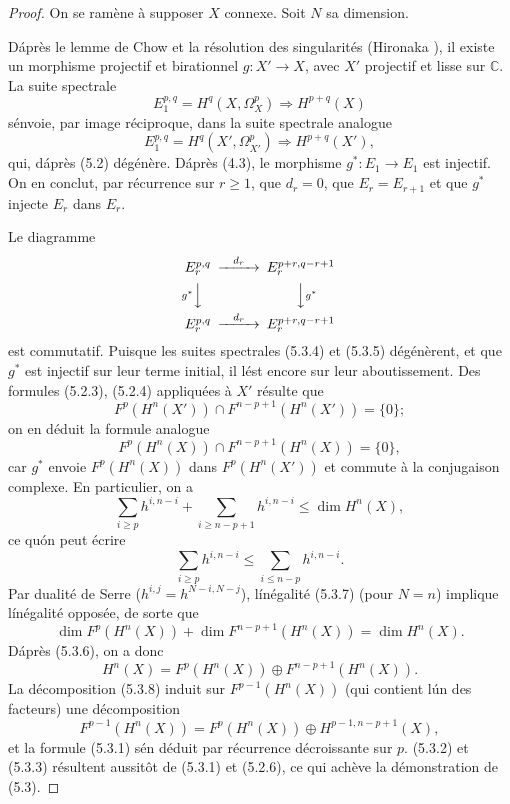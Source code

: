 \documentclass[12pt]{amsart}
\theoremstyle{plain}
\theoremstyle{remark}
\begin{document}
\begin{proof}
On se ram\`ene \`a supposer $X$ connexe. Soit $N$ sa dimension.

D\'apr\`es le lemme de Chow et la r\'esolution des singularit\'es (Hironaka \cite{Hironaka}), il existe un morphisme projectif et birationnel $g : X' \to X$, avec $X'$ projectif et lisse sur $\mathbb{C}$. La suite spectrale
\begin{equation}\label{eq:5.3.4}
E_1^{p,q} = H^q(X, \Omega_{X}^p) \Rightarrow H^{p+q}(X)
\end{equation}
s\'envoie, par image r\'eciproque, dans la suite spectrale analogue
\begin{equation}\label{eq:5.3.5}
E_1^{p,q} = H^q(X', \Omega_{X'}^p) \Rightarrow H^{p+q}(X'),
\end{equation}
qui, d\'apr\`es (5.2) d\'eg\'en\`ere. D\'apr\`es (4.3), le morphisme $g^* : E_1 \to E_1$ est injectif. On en conclut, par r\'ecurrence sur $r \geq 1$, que $d_r = 0$, que $E_r = E_{r+1}$ et que $g^*$ injecte $E_r$ dans $E_r$.

Le diagramme
\[
\begin{CD}
E_r^{p,q} @>{d_r}>> E_r^{p+r,q-r+1} \\
@V{g^*}VV @VV{g^*}V \\
E_r^{p,q} @>{d_r}>> E_r^{p+r,q-r+1}
\end{CD}
\]
est commutatif. Puisque les suites spectrales (5.3.4) et (5.3.5) d\'eg\'en\`erent, et que $g^*$ est injectif sur leur terme initial, il l\'est encore sur leur aboutissement. Des formules (5.2.3), (5.2.4) appliqu\'ees \`a $X'$ r\'esulte que
\[
F^p(H^n(X')) \cap F^{n-p+1}(H^n(X')) = \{0\};
\]
on en d\'eduit la formule analogue
\begin{equation}\label{eq:5.3.6}
F^p(H^n(X)) \cap F^{n-p+1}(H^n(X)) = \{0\},
\end{equation}
car $g^*$ envoie $F^p(H^n(X))$ dans $F^p(H^n(X'))$ et commute \`a la conjugaison complexe. En particulier, on a
\[
\sum_{i \geq p} h^{i,n-i} + \sum_{i \geq n-p+1} h^{i,n-i} \leq \dim H^n(X),
\]
ce qu\'on peut \'ecrire
\begin{equation}\label{eq:5.3.7}
\sum_{i \geq p} h^{i,n-i} \leq \sum_{i \leq n-p} h^{i,n-i}.
\end{equation}
Par dualit\'e de Serre ($h^{i,j} = h^{N-i,N-j}$), l\'in\'egalit\'e (5.3.7) (pour $N = n$) implique l\'in\'egalit\'e oppos\'ee, de sorte que
\[
\dim F^p(H^n(X)) + \dim F^{n-p+1}(H^n(X)) = \dim H^n(X).
\]
D\'apr\`es (5.3.6), on a donc
\begin{equation}\label{eq:5.3.8}
H^n(X) = F^p(H^n(X)) \oplus F^{n-p+1}(H^n(X)).
\end{equation}
La d\'ecomposition (5.3.8) induit sur $F^{p-1}(H^n(X))$ (qui contient l\'un des facteurs) une d\'ecomposition
\[
F^{p-1}(H^n(X)) = F^p(H^n(X)) \oplus H^{p-1,n-p+1}(X),
\]
et la formule (5.3.1) s\'en d\'eduit par r\'ecurrence d\'ecroissante sur $p$. (5.3.2) et (5.3.3) r\'esultent aussit\^ot de (5.3.1) et (5.2.6), ce qui ach\`eve la d\'emonstration de (5.3).
\end{proof}
\end{document}

